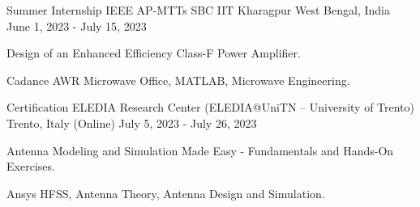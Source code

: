 

\begin{cventries}

  \cventry
    {Summer Internship} %
    {IEEE AP-MTTs SBC IIT Kharagpur} %
    {West Bengal, India} %
    {June 1, 2023 - July 15, 2023} %
    {
      \begin{cvitems} %
        \item {Design of an Enhanced Efficiency Class-F Power Amplifier.}
        \item { Cadance AWR Microwave Office, MATLAB, Microwave Engineering.}
      \end{cvitems}
    }


\cventry
{Certification} %
{ELEDIA Research Center (ELEDIA@UniTN – University of Trento)} %
{Trento, Italy (Online)} %
{July 5, 2023 - July 26, 2023} %
{
	\begin{cvitems} %
		\item {Antenna Modeling and Simulation Made Easy - Fundamentals and Hands-On Exercises.}
		\item { Ansys HFSS, Antenna Theory, Antenna Design and Simulation.}
	\end{cvitems}
}

\end{cventries}
